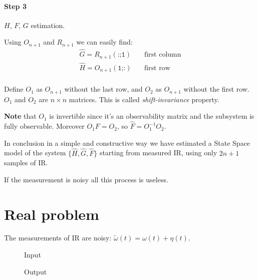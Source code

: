 \paragraph{Step 3} $H$, $F$, $G$ estimation.

Using $O_{n+1}$ and $R_{n+1}$ we can easily find:
\begin{align*}
    \hat{G} = R_{n+1}(\texttt{:;1}) & \quad\text{first column} \\
    \hat{H} = O_{n+1}(\texttt{1;:}) & \quad\text{first row} \\
\end{align*}

Define $O_1$ as $O_{n+1}$ without the last row, and $O_2$ as $O_{n+1}$ without the first row.
$O_1$ and $O_2$ are $n\times n$ matrices.
This is called \emph{shift-invariance} property.

\textbf{Note} that $O_1$ is invertible since it's an observability matrix and the subsystem is fully observable.
Moreover $O_1F = O_2$, so $\hat{F} = O_1^{-1}O_2$.

In conclusion in a simple and constructive way we have estimated a State Space model of the system $\{\hat{H}, \hat{G}, \hat{F}\}$ starting from measured IR, using only $2n+1$ samples of IR.

\begin{rem}
    If the measurement is noisy all this process is useless.
\end{rem}

\section{Real problem}

The measurements of IR are noisy: $\tilde{\omega}(t) = \omega(t) + \eta(t)$.

\begin{figure}[H]
    \begin{minipage}[t]{0.5\textwidth}
        \centering
        \caption*{Input}
    \end{minipage}
    \begin{minipage}[t]{0.5\textwidth}
        \centering
        \caption*{Output}
    \end{minipage}
\end{figure}

